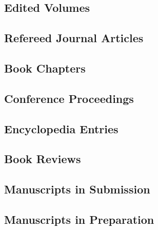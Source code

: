 \documentclass[12pt]{safecv}%
\begin{document}
\subsection*{Edited Volumes}
\subsection*{Refereed Journal Articles}
\subsection*{Book Chapters}
\subsection*{Conference Proceedings}
\subsection*{Encyclopedia Entries}
\subsection*{Book Reviews}
\subsection*{Manuscripts in Submission}
\subsection*{Manuscripts in Preparation}
\end{document}
